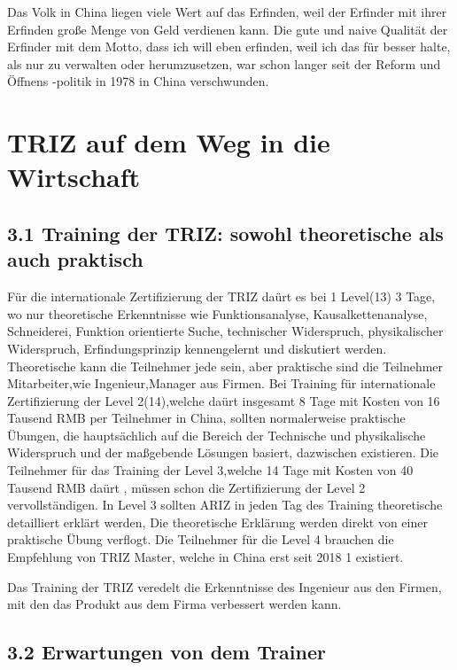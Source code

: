 \documentclass[11pt,a4paper]{article}
\begin{document}
Das Volk in China liegen viele Wert auf das Erfinden, weil der Erfinder mit
ihrer Erfinden große Menge von Geld verdienen kann. Die gute und naive
Qualität der Erfinder mit dem Motto, dass ich will eben erfinden, weil ich das
für besser halte, als nur zu verwalten oder herumzusetzen, war schon langer
seit der Reform und Öffnens -politik in 1978 in China verschwunden.

\section{TRIZ auf dem Weg in die Wirtschaft}

\subsection{3.1   Training der TRIZ: sowohl theoretische als auch praktisch}

Für die internationale Zertifizierung der TRIZ daürt es bei 1 Level(13) 3
Tage, wo nur theoretische Erkenntnisse wie Funktionsanalyse,
Kausalkettenanalyse, Schneiderei, Funktion orientierte Suche, technischer
Widerspruch, physikalischer Widerspruch, Erfindungsprinzip kennengelernt und
diskutiert werden. Theoretische kann die Teilnehmer jede sein, aber praktische
sind die Teilnehmer Mitarbeiter,wie Ingenieur,Manager aus Firmen. Bei Training
für internationale Zertifizierung der Level 2(14),welche daürt insgesamt 8
Tage mit Kosten von 16 Tausend RMB per Teilnehmer in China, sollten
normalerweise praktische Übungen, die hauptsächlich auf die Bereich der
Technische und physikalische Widerspruch und der maßgebende Lösungen basiert,
dazwischen existieren. Die Teilnehmer für das Training der Level 3,welche 14
Tage mit Kosten von 40 Tausend RMB daürt , müssen schon die Zertifizierung
der Level 2 vervollständigen. In Level 3 sollten ARIZ in jeden Tag des
Training theoretische detailliert erklärt werden, Die theoretische Erklärung
werden direkt von einer praktische Übung verflogt. Die Teilnehmer für die
Level 4 brauchen die Empfehlung von TRIZ Master, welche in China erst seit
2018 1 existiert.

Das Training der TRIZ veredelt die Erkenntnisse des Ingenieur aus den Firmen,
mit den das Produkt aus dem Firma verbessert werden kann.
  
\subsection{3.2 Erwartungen von dem Trainer}
\end{document}
